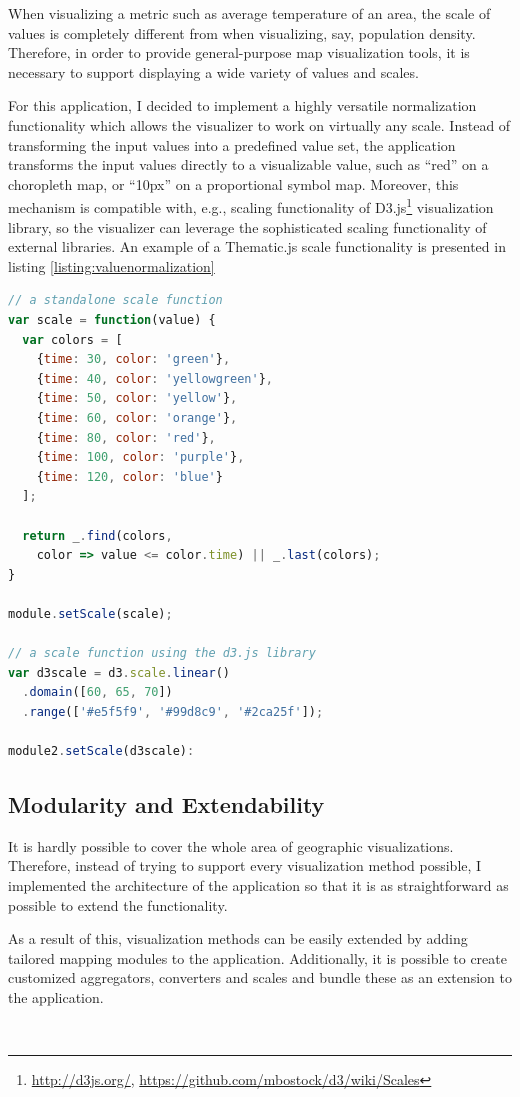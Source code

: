 When visualizing a metric such as average temperature of an area, the scale of values is completely different from when visualizing, say, population density. Therefore, in order to provide general-purpose map visualization tools, it is necessary to support displaying a wide variety of values and scales.

For this application, I decided to implement a highly versatile normalization functionality which allows the visualizer to work on virtually any scale. Instead of transforming the input values into a predefined value set, the application transforms the input values directly to a visualizable value, such as ``red'' on a choropleth map, or ``10px'' on a proportional symbol map. Moreover, this mechanism is compatible with, e.g., scaling functionality of D3.js\footnote{\url{http://d3js.org/}, \url{https://github.com/mbostock/d3/wiki/Scales}} visualization library, so the visualizer can leverage the sophisticated scaling functionality of external libraries. An example of a Thematic.js scale functionality is presented in listing \ref{listing:valuenormalization}

\begin{lstlisting}[caption=An example of Thematic.js scale functionality.,language=JavaScript,label=listing:valuenormalization]
// a standalone scale function
var scale = function(value) {
  var colors = [
    {time: 30, color: 'green'},
    {time: 40, color: 'yellowgreen'},
    {time: 50, color: 'yellow'},
    {time: 60, color: 'orange'},
    {time: 80, color: 'red'},
    {time: 100, color: 'purple'},
    {time: 120, color: 'blue'}
  ];

  return _.find(colors, 
    color => value <= color.time) || _.last(colors);
}

module.setScale(scale);

// a scale function using the d3.js library
var d3scale = d3.scale.linear()
  .domain([60, 65, 70])
  .range(['#e5f5f9', '#99d8c9', '#2ca25f']);

module2.setScale(d3scale):
\end{lstlisting}

\subsection{Modularity and Extendability}

It is hardly possible to cover the whole area of geographic visualizations. Therefore, instead of trying to support every visualization method possible, I implemented the architecture of the application so that it is as straightforward as possible to extend the functionality.

As a result of this, visualization methods can be easily extended by adding tailored mapping modules to the application. Additionally, it is possible to create customized aggregators, converters and scales and bundle these as an extension to the application.

~

